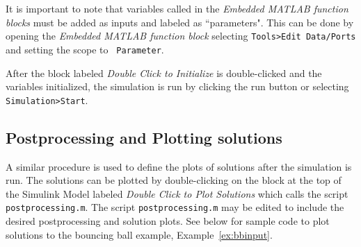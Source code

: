 \documentclass{article}
\begin{document}
\label{scr:initializationBB_inst}


It is important to note that variables called in the {\em Embedded MATLAB function blocks}
must be added as inputs and labeled as ``parameters". This can be done by opening the {\em Embedded MATLAB function block}
selecting {\tt Tools>Edit Data/Ports} and setting the scope to {\tt
Parameter}.

After the block labeled {\em Double Click to Initialize} is double-clicked and the variables initialized, the simulation is run by clicking the run button or selecting {\tt Simulation>Start}.


\subsection{Postprocessing and Plotting solutions}
\label{sec:postprocessing}

A similar procedure is used to define the plots of solutions after the simulation is run. The solutions can be plotted by double-clicking on the block at the top of the Simulink Model labeled {\em Double Click to Plot Solutions} which calls the script {\tt postprocessing.m}. The script {\tt postprocessing.m} may be edited to include the desired postprocessing and solution plots. See below for sample code to plot solutions to the bouncing ball example, Example~\ref{ex:bbinput}.\\

\label{scr:postprocesingBB_inst}
\end{document}

